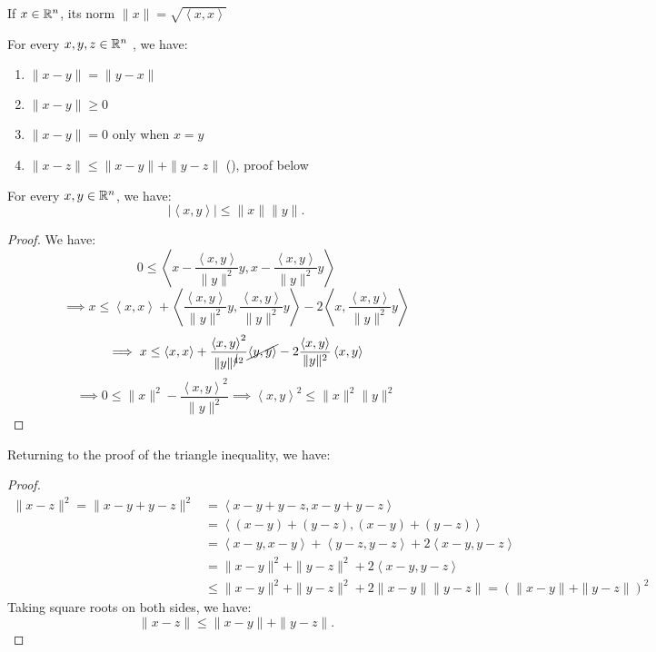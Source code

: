 \documentclass[../main/main.tex]{subfiles}
\begin{document}
\begin{definition}
   If $x\in \mathbb{R}^{n}$, its norm $ \|x\| = \sqrt{\left<x,x\right>} $ 
\end{definition}
\begin{theorem}
   For every $x,y,z \in  \mathbb{R}^{n}$ , we have: 
   \begin{enumerate}
       \item $ \|x-y\| = \|y-x\|$
       \item $ \|x-y\| \ge 0$  
       \item $ \|x-y\| = 0$ only when $x=y$ 
       \item $\|x-z\|\le \|x-y\|+\|y-z\|$ (), proof below
   \end{enumerate}
\end{theorem}
\begin{theorem}{}
   For every $x,y \in  \mathbb{R}^{n}$, we have: \[
   |\left<x,y\right>| \le \|x\|\|y\|
   .\]  
\end{theorem}
\begin{proof}
    We have: \[
    0 \le  \left<x - \frac{\left<x,y\right>}{\|y\|^2}y,x - \frac{\left<x,y\right>}{\|y\|^2}y\right>
    \]\[
    \implies x \le  \left<x,x\right> + \left<\frac{\left<x,y\right>}{\|y\|^2}y, \frac{\left<x,y\right>}{\|y\|^2}y\right>- 2 \left<x, \frac{\left<x,y\right>}{\|y\|^2}y\right>
    \]\[ \implies x \le 
    \left<x,x\right> + \frac{\left<x,y\right>^2}{\|y\|^{\cancel{4}2}}\cancel{\left<y,y\right>}-2 \frac{\left<x,y\right>}{\|y\|^2}\left<x,y\right>
    \]\[
    \implies 0 \le  \|x\|^2 - \frac{\left<x,y\right>^2}{\|y\|^2} \implies \left<x,y\right>^2 \le  \|x\|^2 \|y\|^2 
    \]
\end{proof}
Returning to the proof of the triangle inequality, we have: 
\begin{proof}
    \begin{align*} 
        \|x-z\|^2 = \|x-y+y-z\|^2 &= \left<x-y+y-z, x-y+y-z\right>\\
                                  &= \left<(x-y)+(y-z),(x-y)+(y-z)\right>\\
                                  &= \left<x-y,x-y\right>+\left<y-z,y-z\right>+2\left<x-y,y-z\right>\\
                                  &= \|x-y\|^2 + \|y-z\|^2+2\left<x-y,y-z\right> \\
                                  &\le \|x-y\|^2 + \|y-z\|^2+2\|x-y\|\|y-z\| = \left( \|x-y\|+\|y-z\| \right) ^2
    \end{align*}
Taking square roots on both sides, we have: \[
\|x-z\| \le  \|x-y\| + \|y-z\|
.\] 
    
\end{proof}
\end{document}
